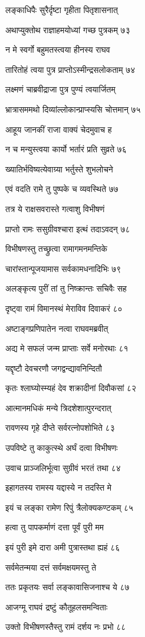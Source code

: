लङ्काधिपैः सुरैर्दृष्टा गृहीता पितृशासनात्

अथाप्युक्तोथ राज्ञाहमयोध्यां गच्छ पुत्रकम् ७३

न मे स्वर्गो बहुमतस्त्वया हीनस्य राघव

तारितोहं त्वया पुत्र प्राप्तोऽस्मीन्द्रसलोकताम् ७४

लक्ष्मणं चाब्रवीद्राजा पुत्र पुण्यं त्वयार्जितम्

भ्रात्रासममथो दिव्यांल्लोकान्प्राप्स्यसि चोत्तमान् ७५

आहूय जानकीं राजा वाक्यं चेदमुवाच ह

न च मन्युस्त्वया कार्यो भर्तारं प्रति सुव्रते ७६

ख्यातिर्भविष्यत्येवाग्र्या भर्तुस्ते शुभलोचने

एवं वदति रामे तु पुष्पके च व्यवस्थिते ७७

तत्र ये राक्षसवरास्ते गत्वाशु विभीषणं

प्राप्तो रामः ससुग्रीवश्चारा इत्थं तदाऽवदन् ७८

विभीषणस्तु तच्छ्रुत्वा रामागमनमन्तिके

चारांस्तान्पूजयामास सर्वकामधनादिभिः ७९

अलङ्कृत्य पुरीं तां तु निष्क्रान्तः सचिवैः सह

दृष्ट्वा रामं विमानस्थं मेराविव दिवाकरं ८०

अष्टाङ्गप्रणिपातेन नत्वा राघवमब्रवीत्

अद्य मे सफलं जन्म प्राप्ताः सर्वे मनोरथाः ८१

यद्दृष्टौ देवचरणौ जगद्वन्द्यावनिन्दितौ

कृतः श्लाघ्योस्म्यहं देव शक्रादीनां दिवौकसां ८२

आत्मानमधिकं मन्ये त्रिदशेशात्पुरन्दरात्

रावणस्य गृहे दीप्ते सर्वरत्नोपशोभिते ८३

उपविष्टे तु काकुत्स्थे अर्घं दत्वा विभीषणः

उवाच प्राञ्जलिर्भूत्वा सुग्रीवं भरतं तथा ८४

इहागतस्य रामस्य यद्दास्ये न तदस्ति मे

इयं च लङ्का रामेण रिपुं त्रैलोक्यकण्टकम् ८५

हत्वा तु पापकर्माणं दत्ता पूर्वं पुरी मम

इयं पुरी इमे दारा अमी पुत्रास्तथा ह्यहं ८६

सर्वमेतन्मया दत्तं सर्वमक्षयमस्तु ते

ततः प्रकृतयः सर्वा लङ्कावासिजनाश्च ये ८७

आजग्मू राघवं द्रष्टुं कौतूहलसमन्विताः

उक्तो विभीषणस्तैस्तु रामं दर्शय नः प्रभो ८८


